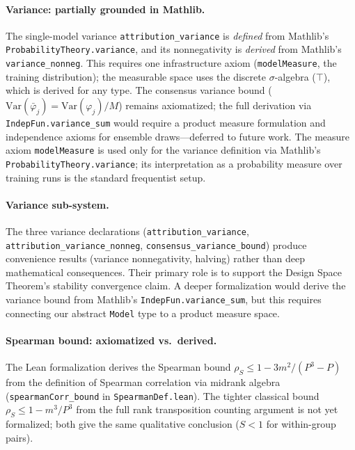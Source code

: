 \documentclass{article}
\newcommand{\Var}{\mathrm{Var}}
\begin{document}
\paragraph{Variance: partially grounded in Mathlib.}
\begin{sloppypar}
The single-model variance \texttt{attribution\allowbreak\_variance} is \emph{defined}
from Mathlib's \texttt{ProbabilityTheory.variance}, and its nonnegativity is
\emph{derived} from Mathlib's \texttt{variance\allowbreak\_nonneg}. This requires
one infrastructure axiom (\texttt{modelMeasure}, the training distribution); the measurable space uses the discrete $\sigma$-algebra ($\top$), which is derived for any type. The consensus variance bound ($\Var(\bar\varphi_j) = \Var(\varphi_j)/M$)
remains axiomatized; the full derivation via \texttt{IndepFun.variance\_sum} would
require a product measure formulation and independence axioms for ensemble
draws---deferred to future work.
The measure axiom \texttt{modelMeasure} is used only for the variance definition via Mathlib's \texttt{ProbabilityTheory.variance}; its interpretation as a probability measure over training runs is the standard frequentist setup.
\end{sloppypar}

\paragraph{Variance sub-system.}
\begin{sloppypar}
The three variance declarations (\texttt{attribution\allowbreak\_variance},
\texttt{attribution\allowbreak\_variance\allowbreak\_nonneg},
\texttt{consensus\allowbreak\_variance\allowbreak\_bound}) produce convenience results
(variance nonnegativity, halving) rather than deep mathematical consequences. Their
primary role is to support the Design Space Theorem's stability convergence claim.
A deeper formalization would derive the variance bound from Mathlib's
\texttt{IndepFun.variance\_sum}, but this requires connecting our abstract
\texttt{Model} type to a product measure space.
\end{sloppypar}

\paragraph{Spearman bound: axiomatized vs.\ derived.}
The Lean formalization derives the Spearman bound $\rho_S \leq 1 - 3m^2/(P^3{-}P)$ from the definition of Spearman correlation via midrank algebra (\texttt{spearmanCorr\_bound} in \texttt{SpearmanDef.lean}). The tighter classical bound $\rho_S \leq 1 - m^3/P^3$ from the full rank transposition counting argument is not yet formalized; both give the same qualitative conclusion ($S < 1$ for within-group pairs).
\end{document}
